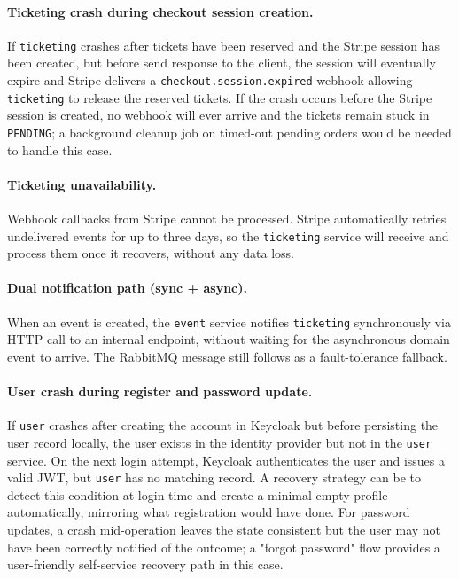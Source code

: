 \paragraph{Ticketing crash during checkout session creation.}
If \texttt{ticketing} crashes after tickets have been reserved and the Stripe session has been created, but before send response to the client, the session will eventually expire and Stripe delivers a \texttt{checkout.session.expired} webhook allowing \texttt{ticketing} to release the reserved tickets. If the crash occurs before the Stripe session is created, no webhook will ever arrive and the tickets remain stuck in \texttt{PENDING}; a background cleanup job on timed-out pending orders would be needed to handle this case.

\paragraph{Ticketing unavailability.}
Webhook callbacks from Stripe cannot be processed. Stripe automatically retries undelivered events for up to three days, so the \texttt{ticketing} service will receive and process them once it recovers, without any data loss.

\paragraph{Dual notification path (sync + async).}
When an event is created, the \texttt{event} service notifies \texttt{ticketing} synchronously via HTTP call to an internal endpoint, without waiting for the asynchronous domain event to arrive. The RabbitMQ message still follows as a fault-tolerance fallback.

\paragraph{User crash during register and password update.}
If \texttt{user} crashes after creating the account in Keycloak but before persisting the user record locally, the user exists in the identity provider but not in the \texttt{user} service. On the next login attempt, Keycloak authenticates the user and issues a valid JWT, but \texttt{user} has no matching record. A recovery strategy can be to detect this condition at login time and create a minimal empty profile automatically, mirroring what registration would have done. For password updates, a crash mid-operation leaves the state consistent but the user may not have been correctly notified of the outcome; a "forgot password" flow provides a user-friendly self-service recovery path in this case.

